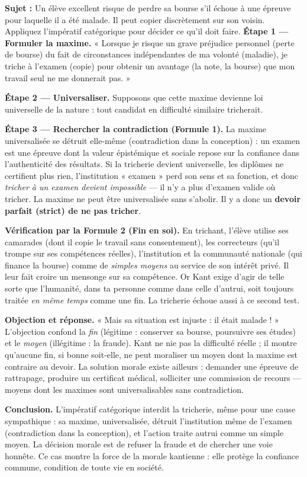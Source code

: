 \documentclass[11pt]{article}
\begin{document}
\begin{exoresolu}
\textbf{Sujet :} Un élève excellent risque de perdre sa bourse s'il échoue à une épreuve pour laquelle il a été malade. Il peut copier discrètement sur son voisin. Appliquez l'impératif catégorique pour décider ce qu'il doit faire.
\tcblower
\textbf{Étape 1 — Formuler la maxime.} « Lorsque je risque un grave préjudice personnel (perte de bourse) du fait de circonstances indépendantes de ma volonté (maladie), je triche à l'examen (copie) pour obtenir un avantage (la note, la bourse) que mon travail seul ne me donnerait pas. »

\textbf{Étape 2 — Universaliser.} Supposons que cette maxime devienne loi universelle de la nature : tout candidat en difficulté similaire tricherait.

\textbf{Étape 3 — Rechercher la contradiction (Formule 1).} La maxime universalisée se détruit elle-même (contradiction dans la conception) : un examen est une épreuve dont la valeur épistémique et sociale repose sur la confiance dans l'authenticité des résultats. Si la tricherie devient universelle, les diplômes ne certifient plus rien, l'institution « examen » perd son sens et sa fonction, et donc \emph{tricher à un examen devient impossible} — il n'y a plus d'examen valide où tricher. La maxime ne peut être universalisée sans s'abolir. Il y a donc un \textbf{devoir parfait (strict) de ne pas tricher}.

\textbf{Vérification par la Formule 2 (Fin en soi).} En trichant, l'élève utilise ses camarades (dont il copie le travail sans consentement), les correcteurs (qu'il trompe sur ses compétences réelles), l'institution et la communauté nationale (qui finance la bourse) comme de \emph{simples moyens} au service de son intérêt privé. Il leur fait croire un mensonge sur sa compétence. Or Kant exige d'agir de telle sorte que l'humanité, dans ta personne comme dans celle d'autrui, soit toujours traitée \emph{en même temps} comme une fin. La tricherie échoue aussi à ce second test.

\textbf{Objection et réponse.} « Mais sa situation est injuste : il était malade ! » L'objection confond la \emph{fin} (légitime : conserver sa bourse, poursuivre ses études) et le \emph{moyen} (illégitime : la fraude). Kant ne nie pas la difficulté réelle ; il montre qu'aucune fin, si bonne soit-elle, ne peut moraliser un moyen dont la maxime est contraire au devoir. La solution morale existe ailleurs : demander une épreuve de rattrapage, produire un certificat médical, solliciter une commission de recours — moyens dont les maximes sont universalisables sans contradiction.

\textbf{Conclusion.} L'impératif catégorique interdit la tricherie, même pour une cause sympathique : sa maxime, universalisée, détruit l'institution même de l'examen (contradiction dans la conception), et l'action traite autrui comme un simple moyen. La décision morale est de refuser la fraude et de chercher une voie honnête. Ce cas montre la force de la morale kantienne : elle protège la confiance commune, condition de toute vie en société.
\end{exoresolu}
\end{document}
